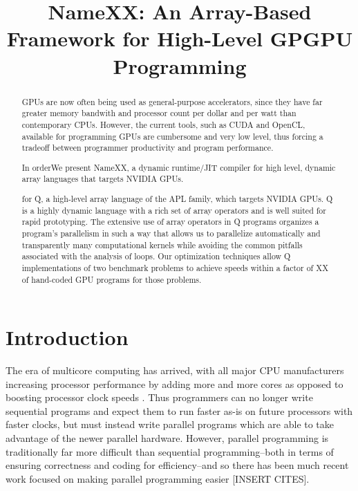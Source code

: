 \documentclass[preprint]{sigplanconf}
\begin{document}


\title{NameXX: An Array-Based Framework for High-Level GPGPU Programming}

\maketitle

\begin{abstract}
GPUs are now often being used as general-purpose accelerators, since they have
far greater memory bandwith and processor count per dollar and per watt than
contemporary CPUs.  However, the current tools, such as CUDA and OpenCL,
available for programming GPUs are cumbersome and very low level, thus forcing
a tradeoff between programmer productivity and program performance.

In orderWe present NameXX, a dynamic runtime/JIT compiler for high level,
dynamic array languages that targets NVIDIA GPUs.

for Q,  a high-level array
language of the APL family, which targets NVIDIA GPUs. Q is a highly dynamic
language with a rich set of
array operators and is well suited for rapid prototyping. The extensive use of
array operators in Q programs organizes a program's parallelism in such a way that allows us to parallelize automatically and transparently
many computational kernels while avoiding the common pitfalls
associated with the analysis of loops. Our optimization techniques allow Q
implementations of two benchmark problems to achieve speeds within a
factor of XX of hand-coded GPU programs for those problems.
\end{abstract}

\section{Introduction}

The era of multicore computing has arrived, with all major CPU manufacturers
increasing processor performance by adding more and more cores as opposed to
boosting processor clock speeds \cite{Asan06}.  Thus programmers can no longer
write sequential programs and expect them to run faster as-is on future
processors with faster clocks, but must instead write parallel programs which
are able to take advantage of the newer parallel hardware.  However, parallel
programming is traditionally far more difficult than sequential
programming--both in terms of ensuring correctness and coding for
efficiency--and so there has been much recent work focused on making parallel
programming easier [INSERT CITES].
\end{document}

